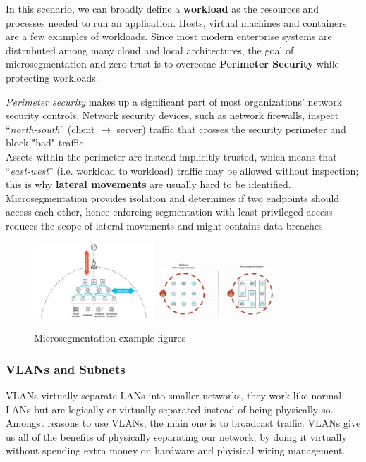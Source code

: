 In this scenario, we can broadly define a \textbf{workload} as the resources and processes
needed to run an application. 
Hosts, virtual machines and containers are a few examples of workloads.
Since most modern enterprise systems are distrubuted among many cloud and local architectures, 
the goal of microsegmentation and zero trust is to overcome
\textbf{Perimeter Security} while protecting workloads.\nl

\textit{Perimeter security} makes up a significant part of most organizations’
network security controls.
Network security devices, such as network firewalls,
inspect “\textit{north-south}” (client $\rightarrow$ server) traffic that crosses the
security perimeter and block "bad" traffic.\\
Assets within the perimeter are instead implicitly trusted,
which means that “\textit{east-west}” (i.e. workload to workload) traffic may be allowed without inspection;
this is why \textbf{lateral movements} are usually hard to be identified.\\
Microsegmentation provides isolation and determines if two endpoints should access each other, hence
enforcing segmentation with least-privileged access reduces the scope of
lateral movements and might contains data breaches.
\begin{figure}[htbp]
   \centering
   \includegraphics[width=0.4\textwidth]{images/microsegmentation_1.png}
   \includegraphics[width=0.4\textwidth]{images/microsegmentation_2.png}
   \caption{Microsegmentation example figures}
   \label{fig:microsegmentation}
\end{figure}

\subsubsection*{VLANs and Subnets}
VLANs virtually separate LANs into smaller networks,
they work like normal LANs but are logically or virtually separated instead of being
physically so.\\
Amongst reasons to use VLANs, the main one is to broadcast traffic.
VLANs give us all of the
benefits of physically separating our network, by doing it virtually without spending extra money on hardware and phyisical wiring management.

